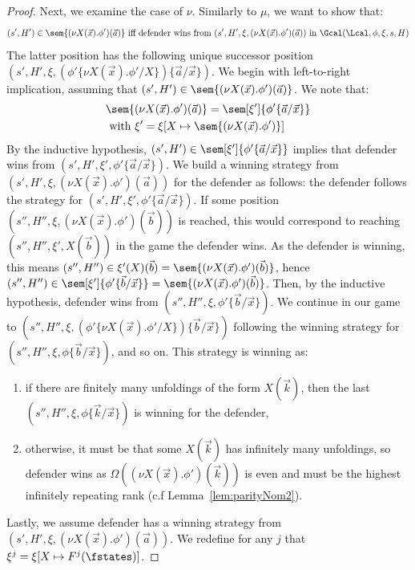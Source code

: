 \begin{proof}
	Next, we examine the case of $\nu$. 
	Similarly to $\mu$, we want to show that:
	\[
	(s', H')\in \sem{(\nu X(\vec x).\phi')(\vec a)} \text{ iff defender wins from }(s', H', \xi, (\nu X(\vec x).\phi')(\vec a))\text{ in }\Gcal(\Lcal, \phi, \xi, s, H)
	\]
	The latter position has the following unique successor position
	$(s', H', \xi, (\phi'\{\nu X(\vec x).\phi'/X\})\{\vec a/\vec x\})$.
	We begin with left-to-right implication, assuming that $(s', H')\in \sem{(\nu X(\vec x).\phi')(\vec a)}$.
	We note that:
	\begin{align*}
		&\sem{(\nu X(\vec x).\phi')(\vec a)} = \sem[\xi']{\phi'\{\vec a / \vec x\}}\\
		&\text{ with } \xi' = \xi[X \mapsto \sem{(\nu X(\vec x).\phi')}]
	\end{align*}
	By the inductive hypothesis, $(s', H') \in \sem[\xi']{\phi'\{\vec a / \vec x\}}$ implies that defender wins from $(s', H', \xi', \phi'\{\vec a / \vec x\})$.
	We build a winning strategy 
	from $(s', H',\xi,(\nu X(\vec x).\phi')(\vec a))$
	for the defender as follows: the defender follows the strategy for $(s', H', \xi', \phi'\{\vec a / \vec x\})$.
	If some position $(s'', H'', \xi, (\nu X(\vec x).\phi')(\vec b))$ is reached, this would correspond to reaching $(s'', H'', \xi', X(\vec b))$ in the game the defender wins. 
	As the defender is winning, this means $(s'', H'')\in \xi'(X)(\vec b) = \sem{(\nu X(\vec x).\phi')(\vec b)}$, hence $(s'', H'')\in \sem[\xi']{\phi'\{\vec b / \vec x\}} = \sem{(\nu X(\vec x).\phi')(\vec b)}$.
	Then, by the inductive hypothesis, defender wins from $(s'', H'', \xi, \phi'\{\vec b / \vec x\})$. 
	We continue in our game to $(s'', H'',\xi, (\phi'\{\nu X(\vec x).\phi'/X\})\{\vec b / \vec x\})$ following the winning strategy for $(s'', H'', \xi, \phi\{\vec b / \vec x\})$, and so on.
	This strategy is winning as:
	\begin{enumerate}
		\item if there are finitely many unfoldings of the form $X(\vec k)$, then the last $(s'', H'', \xi, \phi\{\vec k / \vec x\})$ is winning for the defender,
		\item otherwise, it must be that 
		some $X(\vec k)$ has infinitely many unfoldings, so defender wins as $\Omega((\nu X(\vec x).\phi')(\vec k))$ is even and must be the highest infinitely repeating rank (c.f Lemma~\ref{lem:parityNom2}).
	\end{enumerate}
	Lastly, we assume defender has a winning strategy from $(s', H', \xi, (\nu X(\vec x).\phi')(\vec a))$. 
	We redefine for any $j$ that $\xi^j = \xi[X \mapsto F^j(\fstates)]$.

\end{proof}
